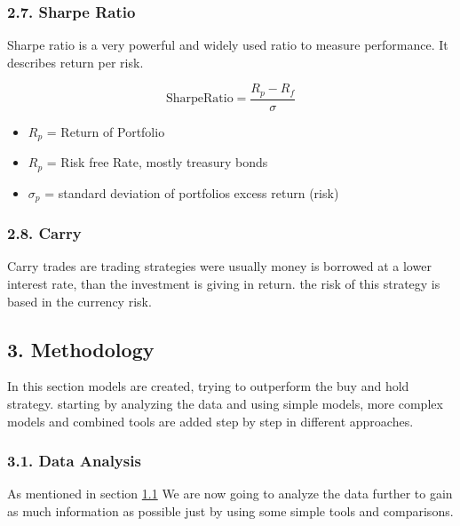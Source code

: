 \documentclass[
]{article}
\providecommand{\tightlist}{%
  \setlength{\itemsep}{0pt}\setlength{\parskip}{0pt}}
\begin{document}
\hypertarget{sharpe-ratio}{%
\subsubsection{2.7. Sharpe Ratio}\label{sharpe-ratio}}

Sharpe ratio is a very powerful and widely used ratio to measure
performance. It describes return per risk.

\begin{equation}
  \label{eq:Sharperatio}
  \mathrm{SharpeRatio}=\frac{R_{p}-R_{f}}{\sigma}
\end{equation}

\begin{itemize}
\tightlist
\item
  \({R_p}\) = Return of Portfolio
\item
  \({R_p}\) = Risk free Rate, mostly treasury bonds
\item
  \({\sigma_p}\) = standard deviation of portfolios excess return (risk)
\end{itemize}

\hypertarget{carry}{%
\subsubsection{2.8. Carry}\label{carry}}

Carry trades are trading strategies were usually money is borrowed at a
lower interest rate, than the investment is giving in return. the risk
of this strategy is based in the currency risk.

\newpage

\newpage

\hypertarget{methodology}{%
\subsection{3. Methodology}\label{methodology}}

In this section models are created, trying to outperform the buy and
hold strategy. starting by analyzing the data and using simple models,
more complex models and combined tools are added step by step in
different approaches.

\hypertarget{data-analysis-1}{%
\subsubsection{3.1. Data Analysis}\label{data-analysis-1}}

As mentioned in section \protect\hyperlink{ts-analysis}{1.1} We are now
going to analyze the data further to gain as much information as
possible just by using some simple tools and comparisons.
\end{document}
